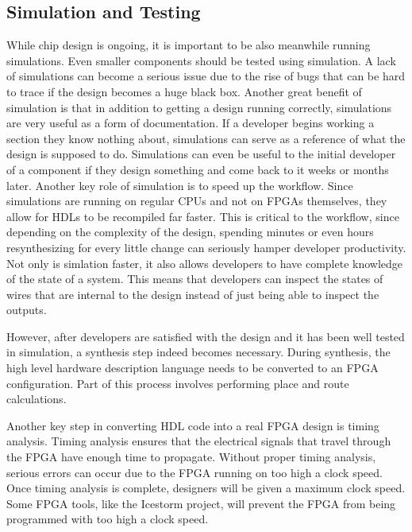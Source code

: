 \documentclass{article}
\begin{document}
    \subsection{Simulation and Testing}

    While chip design is ongoing, it is important to be also meanwhile running simulations.
    Even smaller components should be tested using simulation. A lack of simulations
    can become a serious issue due to the rise of bugs that can be hard to trace if
    the design becomes a huge black box. Another great benefit of simulation is that
    in addition to getting a design running correctly, simulations are very useful
    as a form of documentation. If a developer begins working a section they know nothing
    about, simulations can serve as a reference of what the design is supposed to do.
    Simulations can even be useful to the initial developer of a component if they design
    something and come back to it weeks or months later.
    Another key role of simulation is to speed up the workflow. Since simulations
    are running on regular CPUs and not on FPGAs themselves, they allow for HDLs to
    be recompiled far faster. This is critical to the workflow, since depending on
    the complexity of the design, spending minutes or even hours resynthesizing for
    every little change can seriously hamper developer productivity.
    Not only is simlation faster, it also allows developers to have complete knowledge
    of the state of a system. This means that developers can inspect the states
    of wires that are internal to the design instead of just being able to inspect the
    outputs.

    However, after developers are satisfied with the design and it has been well tested
    in simulation, a synthesis step indeed becomes necessary.
    During synthesis, the high level hardware description language needs to be converted
    to an FPGA configuration. Part of this process involves performing place and route
    calculations.

    Another key step in converting HDL code into a real FPGA design is timing analysis.
    Timing analysis ensures that the electrical signals that travel through the FPGA
    have enough time to propagate. Without proper timing analysis, serious errors
    can occur due to the FPGA running on too high a clock speed. Once timing analysis
    is complete, designers will be given a maximum clock speed.
    Some FPGA tools, like the Icestorm project, will prevent the FPGA from being
    programmed with too high a clock speed.
    
\end{document}
